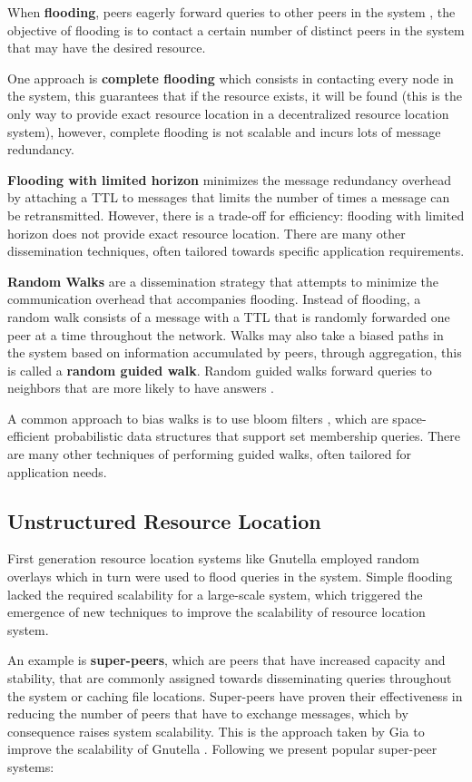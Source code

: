 When \textbf{flooding}, peers eagerly forward queries to other peers in the system , the objective of flooding is to contact a certain number of distinct peers in the system that may have the desired resource.

One approach is \textbf{complete flooding} which consists in contacting every node in the system, this guarantees that if the resource exists, it will be found (this is the only way to provide exact resource location in a decentralized resource location system), however, complete flooding is not scalable and incurs lots of message redundancy. 

\textbf{Flooding with limited horizon} minimizes the message redundancy overhead by attaching a TTL to messages that limits the number of times a message can be retransmitted. However, there is a trade-off for efficiency: flooding with limited horizon does not provide exact resource location. There are many other dissemination techniques, often tailored towards specific application requirements.

\textbf{Random Walks} are a dissemination strategy that attempts to minimize the communication overhead that accompanies flooding. Instead of flooding, a random walk consists of a message with a TTL that is randomly forwarded one peer at a time throughout the network. Walks may also take a biased paths in the system based on information accumulated by peers, through aggregation, this is called a \textbf{random guided walk}. Random guided walks  forward queries to neighbors that are more likely to have answers \cite{1022239}. 

A common approach to bias walks is to use bloom filters \cite{5751342}, which are space-efficient probabilistic data structures that support set membership queries. There are many other techniques of performing guided walks, often tailored for application needs.

\subsection{Unstructured Resource Location}

First generation resource location systems like Gnutella \cite{gnutella_gtk} employed random overlays which in turn were used to flood queries in the system. Simple flooding lacked the required scalability for a large-scale system, which triggered the emergence of new techniques to improve the scalability of resource location system. 

An example is \textbf{super-peers}, which are peers that have increased capacity and stability, that are commonly assigned towards disseminating queries throughout the system or caching file locations. Super-peers have proven their effectiveness in reducing the number of peers that have to exchange messages, which by consequence raises system scalability. This is the approach taken by Gia \cite{Chawathe2003} to improve the scalability of Gnutella \cite{gnutella_gtk}. Following we present popular super-peer systems:

